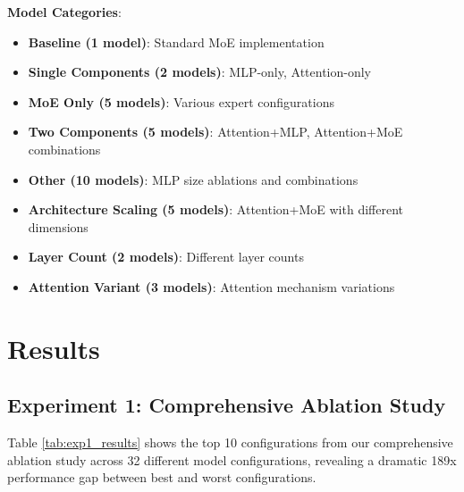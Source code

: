 \documentclass[11pt,a4paper]{article}
\begin{document}
\textbf{Model Categories}:
\begin{itemize}
    \item \textbf{Baseline (1 model)}: Standard MoE implementation
    \item \textbf{Single Components (2 models)}: MLP-only, Attention-only
    \item \textbf{MoE Only (5 models)}: Various expert configurations
    \item \textbf{Two Components (5 models)}: Attention+MLP, Attention+MoE combinations
    \item \textbf{Other (10 models)}: MLP size ablations and combinations
    \item \textbf{Architecture Scaling (5 models)}: Attention+MoE with different dimensions
    \item \textbf{Layer Count (2 models)}: Different layer counts
    \item \textbf{Attention Variant (3 models)}: Attention mechanism variations
\end{itemize}

\section{Results}

\subsection{Experiment 1: Comprehensive Ablation Study}

Table \ref{tab:exp1_results} shows the top 10 configurations from our comprehensive ablation study across 32 different model configurations, revealing a dramatic 189x performance gap between best and worst configurations.
\end{document}
